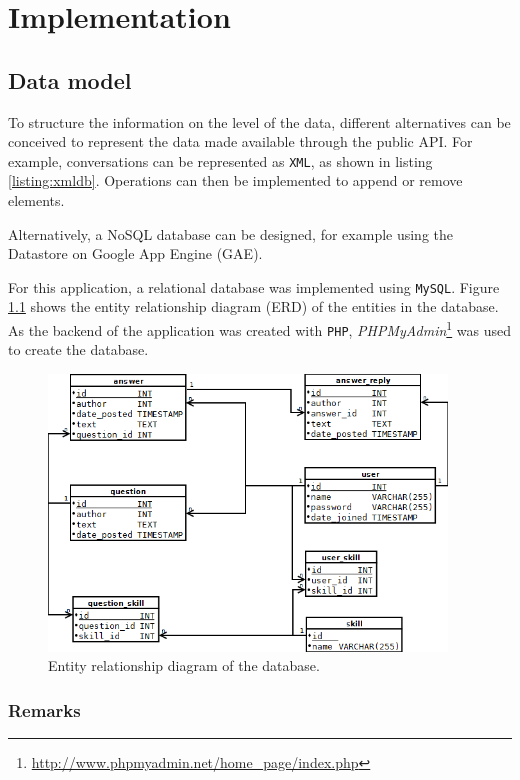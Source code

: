 \chapter{Implementation}\label{chapter:implementation}

\section{Data model}\label{section:datamodel}

To structure the information on the level of the data, different alternatives can be conceived to represent the data made available through the public API. For example, conversations can be represented as \texttt{XML}, as shown in listing \ref{listing:xmldb}. Operations can then be implemented to append or remove elements.



Alternatively, a NoSQL database can be designed, for example using the Datastore on Google App Engine (GAE).

For this application, a relational database was implemented using \texttt{MySQL}. Figure \ref{figure:erd} shows the entity relationship diagram (ERD) of the entities in the database. As the backend of the application was created with \texttt{PHP}, \emph{PHPMyAdmin}\footnote{\url{http://www.phpmyadmin.net/home_page/index.php}} was used to create the database.

\begin{figure}
	\includegraphics[width=400px]{img/erd}
	\caption{Entity relationship diagram of the database.}
	\label{figure:erd}
\end{figure}

\subsection{Remarks}

